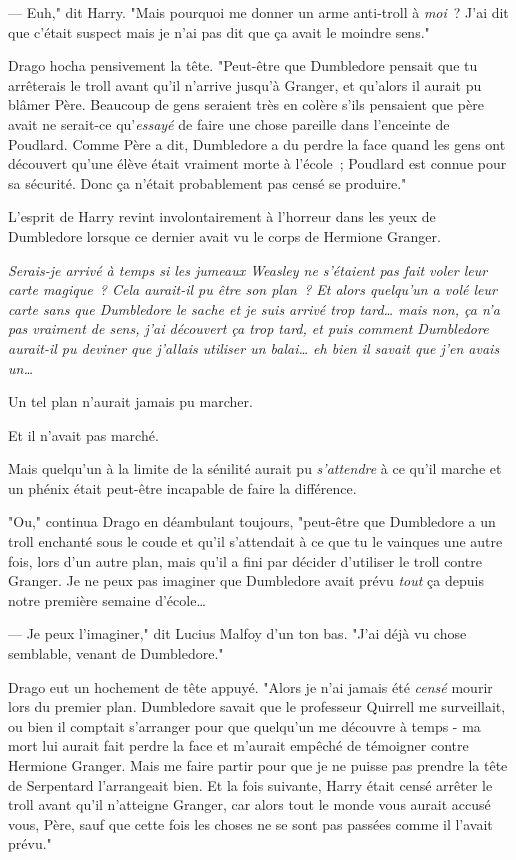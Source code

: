 --- Euh," dit Harry. "Mais pourquoi me donner un arme anti-troll à \emph{moi}~? J'ai dit que c'était suspect mais je n'ai pas dit que ça avait le moindre sens."

Drago hocha pensivement la tête. "Peut-être que Dumbledore pensait que tu arrêterais le troll avant qu'il n'arrive jusqu'à Granger, et qu'alors il aurait pu blâmer Père. Beaucoup de gens seraient très en colère s'ils pensaient que père avait ne serait-ce qu'\emph{essayé} de faire une chose pareille dans l'enceinte de Poudlard. Comme Père a dit, Dumbledore a du perdre la face quand les gens ont découvert qu'une élève était vraiment morte à l'école~; Poudlard est connue pour sa sécurité. Donc ça n'était probablement pas censé se produire."

L'esprit de Harry revint involontairement à l'horreur dans les yeux de Dumbledore lorsque ce dernier avait vu le corps de Hermione Granger.

\emph{Serais-je arrivé à temps si les jumeaux Weasley ne s'étaient pas fait voler leur carte magique~? Cela aurait-il pu être son plan~? Et alors quelqu'un a volé leur carte sans que Dumbledore le sache et je suis arrivé trop tard… mais non, ça n'a pas vraiment de sens, j'ai découvert ça trop tard, et puis comment Dumbledore aurait-il pu deviner que j'allais utiliser un balai… eh bien il savait que j'en avais un…}

Un tel plan n'aurait jamais pu marcher.

Et il n'avait pas marché.

Mais quelqu'un à la limite de la sénilité aurait pu \emph{s'attendre} à ce qu'il marche et un phénix était peut-être incapable de faire la différence.

"Ou," continua Drago en déambulant toujours, "peut-être que Dumbledore a un troll enchanté sous le coude et qu'il s'attendait à ce que tu le vainques une autre fois, lors d'un autre plan, mais qu'il a fini par décider d'utiliser le troll contre Granger. Je ne peux pas imaginer que Dumbledore avait prévu \emph{tout} ça depuis notre première semaine d'école…

--- Je peux l'imaginer," dit Lucius Malfoy d'un ton bas. "J'ai déjà vu chose semblable, venant de Dumbledore."

Drago eut un hochement de tête appuyé. "Alors je n'ai jamais été \emph{censé} mourir lors du premier plan. Dumbledore savait que le professeur Quirrell me surveillait, ou bien il comptait s'arranger pour que quelqu'un me découvre à temps - ma mort lui aurait fait perdre la face et m'aurait empêché de témoigner contre Hermione Granger. Mais me faire partir pour que je ne puisse pas prendre la tête de Serpentard l'arrangeait bien. Et la fois suivante, Harry était censé arrêter le troll avant qu'il n'atteigne Granger, car alors tout le monde vous aurait accusé vous, Père, sauf que cette fois les choses ne se sont pas passées comme il l'avait prévu."

